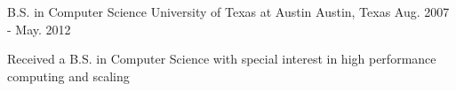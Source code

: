 


\begin{cventries}


\cventry
{B.S. in Computer Science} %
{University of Texas at Austin} %
{Austin, Texas} %
{Aug. 2007 - May. 2012} %
{ %
\begin{cvitems}
\item {Received a B.S. in Computer Science with special interest in high performance computing and scaling}
\end{cvitems}
}


\end{cventries}